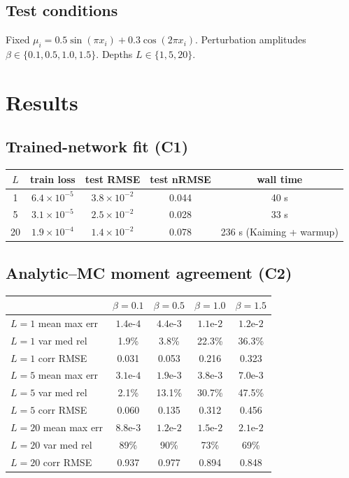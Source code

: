 \documentclass[11pt]{article}
\begin{document}
\subsection{Test conditions}
Fixed $\mu_i = 0.5\sin(\pi x_i) + 0.3\cos(2\pi x_i)$. Perturbation amplitudes $\beta \in \{0.1, 0.5, 1.0, 1.5\}$. Depths $L \in \{1, 5, 20\}$.

\section{Results}
\subsection{Trained-network fit (C1)}
\begin{center}
\begin{tabular}{ccccc}
\toprule
$L$ & train loss & test RMSE & test nRMSE & wall time \\
\midrule
1  & $6.4\times10^{-5}$ & $3.8\times10^{-2}$ & 0.044 & 40 s \\
5  & $3.1\times10^{-5}$ & $2.5\times10^{-2}$ & 0.028 & 33 s \\
20 & $1.9\times10^{-4}$ & $1.4\times10^{-2}$ & 0.078 & 236 s (Kaiming + warmup) \\
\bottomrule
\end{tabular}
\end{center}

\subsection{Analytic--MC moment agreement (C2)}
\begin{center}\small
\begin{tabular}{lcccc}
\toprule
& $\beta=0.1$ & $\beta=0.5$ & $\beta=1.0$ & $\beta=1.5$ \\
\midrule
$L{=}1$ mean max err   & $1.4\text{e-}4$ & $4.4\text{e-}3$ & $1.1\text{e-}2$ & $1.2\text{e-}2$ \\
$L{=}1$ var med rel    & 1.9\% & 3.8\% & 22.3\% & 36.3\% \\
$L{=}1$ corr RMSE      & 0.031 & 0.053 & 0.216 & 0.323 \\
\midrule
$L{=}5$ mean max err   & $3.1\text{e-}4$ & $1.9\text{e-}3$ & $3.8\text{e-}3$ & $7.0\text{e-}3$ \\
$L{=}5$ var med rel    & 2.1\% & 13.1\% & 30.7\% & 47.5\% \\
$L{=}5$ corr RMSE      & 0.060 & 0.135 & 0.312 & 0.456 \\
\midrule
$L{=}20$ mean max err  & $8.8\text{e-}3$ & $1.2\text{e-}2$ & $1.5\text{e-}2$ & $2.1\text{e-}2$ \\
$L{=}20$ var med rel   & 89\% & 90\% & 73\% & 69\% \\
$L{=}20$ corr RMSE     & 0.937 & 0.977 & 0.894 & 0.848 \\
\bottomrule
\end{tabular}
\end{center}
\end{document}
